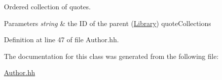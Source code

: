 Ordered collection of quotes. 


\begin{DoxyParams}{Parameters}
{\em string} & the ID of the parent (\hyperlink{class_library}{Library}) quote\+Collection\textquotesingle{}s \\
\hline
\end{DoxyParams}


Definition at line 47 of file Author.\+hh.



The documentation for this class was generated from the following file\+:\begin{DoxyCompactItemize}
\item 
\hyperlink{_author_8hh}{Author.\+hh}\end{DoxyCompactItemize}
